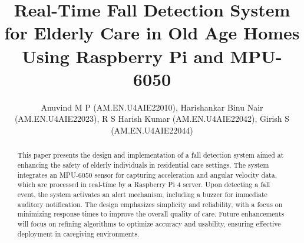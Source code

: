 \documentclass[final,5p,times,twocolumn,authoryear]{elsarticle}
\begin{document}
\begin{frontmatter}



\title{Real-Time Fall Detection System for Elderly Care in Old Age Homes Using Raspberry Pi and MPU-6050 }


\author{Anuvind M P (AM.EN.U4AIE22010),  Harishankar Binu Nair (AM.EN.U4AIE22023),  R S Harish Kumar (AM.EN.U4AIE22042),   Girish S (AM.EN.U4AIE22044)}

\begin{abstract}
This paper presents the design and implementation of a fall detection system aimed at enhancing the safety of elderly individuals in residential care settings. The system integrates an MPU-6050 sensor for capturing acceleration and angular velocity data, which are processed in real-time by a Raspberry Pi 4 server. Upon detecting a fall event, the system activates an alert mechanism, including a buzzer for immediate auditory notification. The design emphasizes simplicity and reliability, with a focus on minimizing response times to improve the overall quality of care. Future enhancements will focus on refining algorithms to optimize accuracy and usability, ensuring effective deployment in caregiving environments. 
\end{abstract}


\end{frontmatter}
\end{document}
